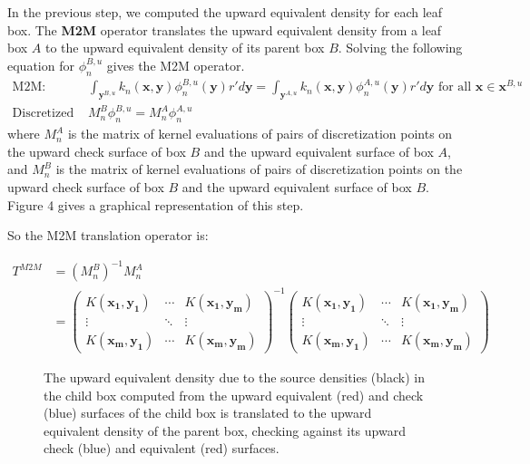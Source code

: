 \documentclass[11pt, oneside]{article}   	%
\begin{document}
In the previous step, we computed the upward equivalent density for each leaf box. The \textbf{M2M} operator translates the upward equivalent density from a leaf box $A$ to the upward equivalent density of its parent box $B$. Solving the following equation for $\phi_n^{B,u}$ gives the M2M operator.
\begin{align}
\mbox{M2M: }&\int_{\mathbf{y}^{B,u}}{k_n(\mathbf{x},\mathbf{y})}\phi^{B,u}_n{(\mathbf{y})}r'd\mathbf{y} = \int_{\mathbf{y}^{A,u}}{k_n(\mathbf{x},\mathbf{y})}\phi^{A,u}_n{(\mathbf{y})}r'd\mathbf{y}\mbox{ for all }\mathbf{x}\in\mathbf{x}^{B,u}\\
\mbox{Discretized M2M: }&M_n^B\phi^{B,u}_n=M_n^A\phi^{A,u}_n
\end{align}
where $M_n^A$ is the matrix of kernel evaluations of pairs of discretization points on the upward check surface of box $B$ and the upward equivalent surface of box $A$, and $M_n^B$ is the matrix of kernel evaluations of pairs of discretization points on the upward check surface of box $B$ and the upward equivalent surface of box $B$. Figure 4 gives a graphical representation of this step.

So the M2M translation operator is:

\begin{align}
T^{M2M} &= (M_n^B)^{-1}M_n^A\\
&= \begin{pmatrix}
  K(\mathbf{x_1},\mathbf{y_1}) & \cdots & K(\mathbf{x_1},\mathbf{y_m})  \\
  \vdots  & \ddots & \vdots  \\
  K(\mathbf{x_m},\mathbf{y_1}) & \cdots & K(\mathbf{x_m},\mathbf{y_m}) 
 \end{pmatrix}^{-1}\begin{pmatrix}
  K(\mathbf{x_1},\mathbf{y_1}) & \cdots & K(\mathbf{x_1},\mathbf{y_m})  \\
  \vdots  & \ddots & \vdots  \\
  K(\mathbf{x_m},\mathbf{y_1}) & \cdots & K(\mathbf{x_m},\mathbf{y_m}) 
 \end{pmatrix}
\end{align}


\begin{figure}[!ht]
\begin{center}
\end{center}
\caption{The upward equivalent density due to the source densities (black) in the child box computed from the upward equivalent (red) and check (blue) surfaces of the child box is translated to the upward equivalent density of the parent box, checking against its upward check (blue) and equivalent (red) surfaces.}
\end{figure}
\end{document}
